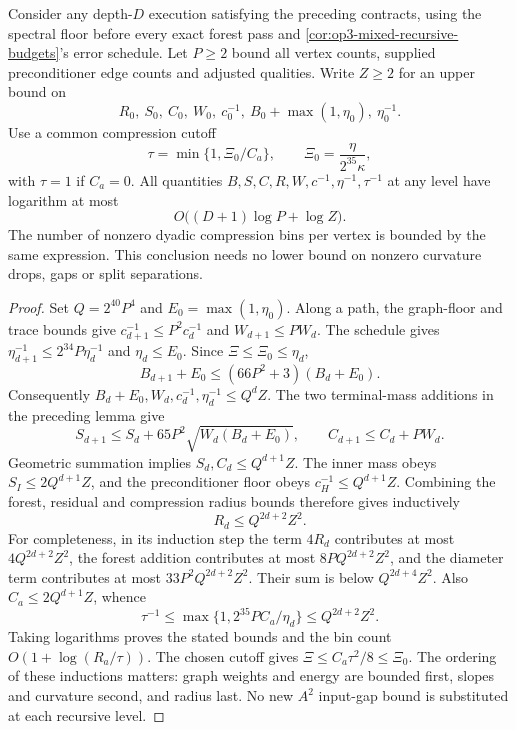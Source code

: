 \begin{theorem}
\label{thm:op3-simultaneous-recursive-ranges}
Consider any depth-$D$ execution satisfying the preceding contracts,
using the spectral floor before every exact forest pass and
\cref{cor:op3-mixed-recursive-budgets}'s error schedule.
Let $P\geq2$ bound all vertex counts, supplied preconditioner edge counts
and adjusted qualities. Write $Z\geq2$ for an upper bound on
\[
 R_0,\ S_0,\ C_0,\ W_0,\ c_0^{-1},\ B_0+\max(1,\eta_0),
 \ \eta_0^{-1}.
\]
Use a common compression cutoff
\[
 \tau=\min\{1,\Xi_0/C_a\},\qquad
 \Xi_0=\frac{\eta}{2^{35}\kappa},
\]
with $\tau=1$ if $C_a=0$. All quantities
$B,S,C,R,W,c^{-1},\eta^{-1},\tau^{-1}$ at any level have logarithm
at most
\[
 O\bigl((D+1)\log P+\log Z\bigr).
\]
The number of nonzero dyadic compression bins per vertex is bounded by
the same expression. This conclusion needs no lower bound on nonzero
curvature drops, gaps or split separations.
\end{theorem}
\begin{proof}
Set $Q=2^{40}P^4$ and $E_0=\max(1,\eta_0)$. Along a path, the
graph-floor and trace bounds give $c_{d+1}^{-1}\leq P^2c_d^{-1}$
and $W_{d+1}\leq PW_d$. The schedule gives
$\eta_{d+1}^{-1}\leq2^{34}P\eta_d^{-1}$ and $\eta_d\leq E_0$.
Since $\Xi\leq\Xi_0\leq\eta_d$,
\[
 B_{d+1}+E_0\leq(66P^2+3)(B_d+E_0).
\]
Consequently $B_d+E_0,W_d,c_d^{-1},\eta_d^{-1}\leq Q^dZ$.
The two terminal-mass additions in the preceding lemma give
\[
 S_{d+1}\leq S_d+65P^2\sqrt{W_d(B_d+E_0)},\qquad
 C_{d+1}\leq C_d+PW_d.
\]
Geometric summation implies $S_d,C_d\leq Q^{d+1}Z$.
The inner mass obeys $S_I\leq2Q^{d+1}Z$, and the preconditioner floor
obeys $c_H^{-1}\leq Q^{d+1}Z$. Combining the forest, residual and
compression radius bounds therefore gives inductively
\[
 R_d\leq Q^{2d+2}Z^2.
\]
For completeness, in its induction step the term $4R_d$ contributes
at most $4Q^{2d+2}Z^2$, the forest addition contributes at most
$8P Q^{2d+2}Z^2$, and the diameter term contributes at most
$33P^2Q^{2d+2}Z^2$. Their sum is below $Q^{2d+4}Z^2$.
Also $C_a\leq2Q^{d+1}Z$, whence
\[
 \tau^{-1}\leq\max\{1,2^{35}PC_a/\eta_d\}
 \leq Q^{2d+2}Z^2.
\]
Taking logarithms proves the stated bounds and the bin count
$O(1+\log(R_a/\tau))$. The chosen cutoff gives
$\Xi\leq C_a\tau^2/8\leq\Xi_0$.
The ordering of these inductions matters: graph weights and energy are
bounded first, slopes and curvature second, and radius last. No new
$A^2$ input-gap bound is substituted at each recursive level.
\end{proof}


